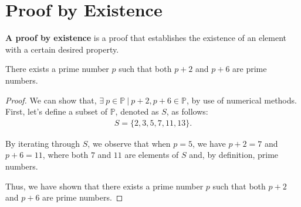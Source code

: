 \documentclass{report}
\begin{document}
    \section{\LARGE Proof by Existence}
    \bigbreak \noindent 
    \smallbreak \noindent
    \begin{definition}
    \textbf{A proof by existence} is a proof that establishes the existence of an element with a certain desired property. 
\end{definition}
\bigbreak \noindent 
\begin{remark}
    There exists a prime number \(p\) such that both \(p+2\) and \(p+6\) are prime numbers.
\end{remark}
\bigbreak \noindent 
\begin{proof}
    We can show that, \(\exists\ p \in \mathbb{P}\ |\ p+2, p+6 \in \mathbb{P}\), by use of numerical methods. First, let's define a subset of \(\mathbb{P}\), denoted as \(S\), as follows:
    \begin{align*}
        S = \{2,3,5,7,11,13\}.
    \end{align*}
    \bigbreak \noindent 

    By iterating through \(S\), we observe that when \(p=5\), we have \(p+2 = 7\) and \(p+6 = 11\), where both \(7\) and \(11\) are elements of \(S\) and, by definition, prime numbers.
    \bigbreak \noindent 

    Thus, we have shown that there exists a prime number \(p\) such that both \(p+2\) and \(p+6\) are prime numbers.
    \bigbreak \noindent 
    \ep
\end{proof}
\end{document}
